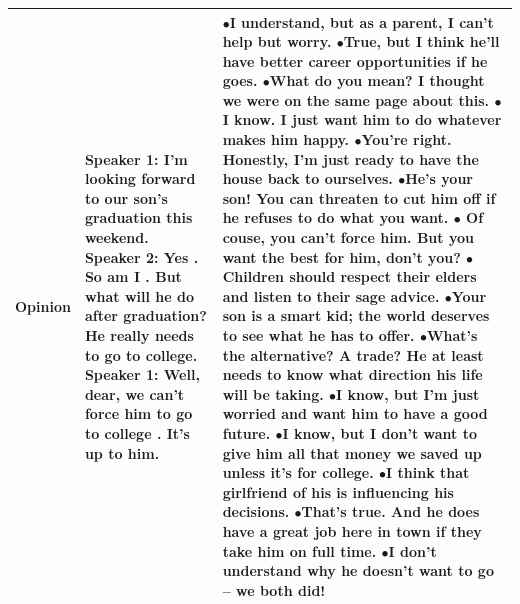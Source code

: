 \documentclass[11pt]{article}
\begin{document}
\begin{longtable}{|p{2cm}|p{3cm}|p{10cm}|}
 Opinion & \textbf{Speaker 1:} I'm looking forward to our son's graduation this weekend. \newline \hspace*{0.5cm} \textbf{Speaker 2:} Yes . So am I . But what will he do after graduation? He really needs to go to college. \newline \textbf{Speaker 1:} Well, dear, we can't force him to go to college . It's up to him. &  $\bullet$I understand, but as a parent, I can't help but worry. \newline $\bullet$True, but I think he'll have better career opportunities if he goes. \newline $\bullet$What do you mean? I thought we were on the same page about this. \newline $\bullet$I know. I just want him to do whatever makes him happy. \newline $\bullet$You're right. Honestly, I'm just ready to have the house back to ourselves.	\newline \newline $\bullet$He's your son! You can threaten to cut him off if he refuses to do what you want. \newline $\bullet$ Of couse, you can't force him. But you want the best for him, don't you? \newline $\bullet$Children should respect their elders and listen to their sage advice. \newline $\bullet$Your son is a smart kid; the world deserves to see what he has to offer. \newline $\bullet$What's the alternative? A trade? He at least needs to know what direction his life will be taking. \newline \newline $\bullet$I know, but I'm just worried and want him to have a good future. \newline $\bullet$I know, but I don't want to give him all that money we saved up unless it's for college. \newline $\bullet$I think that girlfriend of his is influencing his decisions. \newline $\bullet$That's true. And he does have a great job here in town if they take him on full time. \newline $\bullet$I don't understand why he doesn't want to go -- we both did! \\\hline

\end{longtable}
\end{document}
